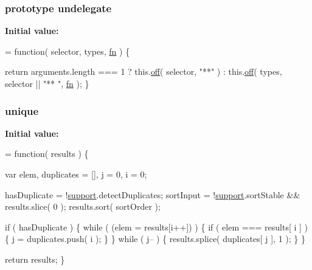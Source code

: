 \hypertarget{jquery-1_810_82-vsdoc_8js_adf3212944c5742602d54b599a05f0746}{
\subsubsection[{undelegate}]{ {\bf prototype} undelegate}}\label{jquery-1_810_82-vsdoc_8js_adf3212944c5742602d54b599a05f0746}
{\bfseries Initial value\-:}
\begin{DoxyCode}
= \textcolor{keyword}{function}( selector, types, \hyperlink{jquery-1_810_82-vsdoc_8js_acef6bdaf6b9b20fdcca1ea86f0902c3b}{fn} ) \{


        
        \textcolor{keywordflow}{return} arguments.length === 1 ? this.\hyperlink{jquery-1_810_82-vsdoc_8js_abd3345ae76b0b1425e11cd916e7bc97c}{off}( selector, \textcolor{stringliteral}{"**"} ) : this.\hyperlink{jquery-1_810_82-vsdoc_8js_abd3345ae76b0b1425e11cd916e7bc97c}{off}( types, selector || \textcolor{stringliteral}{"**
      "}, \hyperlink{jquery-1_810_82-vsdoc_8js_acef6bdaf6b9b20fdcca1ea86f0902c3b}{fn} );
    \}
\end{DoxyCode}
\hypertarget{jquery-1_810_82-vsdoc_8js_a55d5adf9da69a81b8295f6bedfc34f60}{
\subsubsection[{unique}]{ unique}}\label{jquery-1_810_82-vsdoc_8js_a55d5adf9da69a81b8295f6bedfc34f60}
{\bfseries Initial value\-:}
\begin{DoxyCode}
= \textcolor{keyword}{function}( results ) \{


    var elem,
        duplicates = [],
        j = 0,
        i = 0;

    
    hasDuplicate = !\hyperlink{jquery-1_810_82-vsdoc_8js_a1be69652377630fc5432ae5ec6463744}{support}.detectDuplicates;
    sortInput = !\hyperlink{jquery-1_810_82-vsdoc_8js_a1be69652377630fc5432ae5ec6463744}{support}.sortStable && results.slice( 0 );
    results.sort( sortOrder );

    \textcolor{keywordflow}{if} ( hasDuplicate ) \{
        \textcolor{keywordflow}{while} ( (elem = results[i++]) ) \{
            \textcolor{keywordflow}{if} ( elem === results[ i ] ) \{
                j = duplicates.push( i );
            \}
        \}
        \textcolor{keywordflow}{while} ( j-- ) \{
            results.splice( duplicates[ j ], 1 );
        \}
    \}

    \textcolor{keywordflow}{return} results;
\}
\end{DoxyCode}
